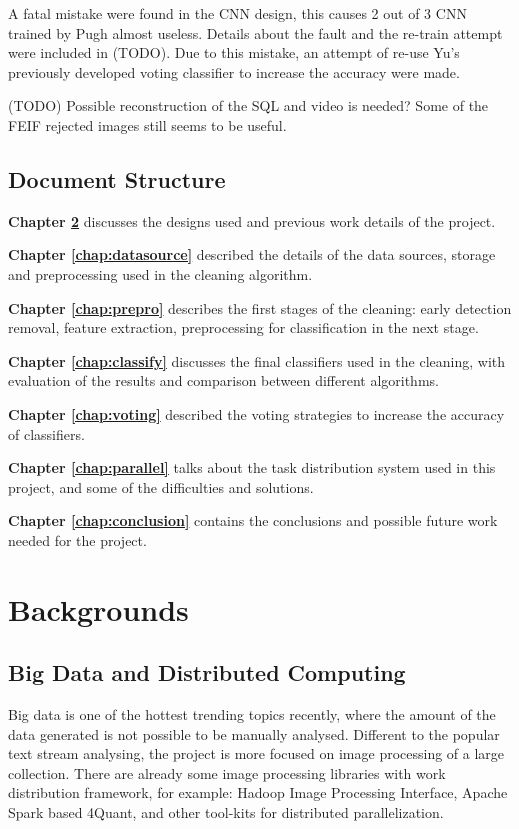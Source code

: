 \documentclass[bsc,logo,twoside,fullspacing,parskip]{infthesis}
\begin{document}
A fatal mistake were found in the CNN design, this causes 2 out of 3 CNN trained by Pugh almost useless. Details about the fault and the re-train attempt were included in (TODO).
Due to this mistake, an attempt of re-use Yu's previously developed voting classifier to increase the accuracy were made. 

(TODO) Possible reconstruction of the SQL and video is needed? Some of the FEIF rejected images still seems to be useful.

\section{Document Structure}

\textbf{Chapter \ref{chap:bg}} discusses the designs used and previous work details of the project. 

\textbf{Chapter \ref{chap:datasource}} described the details of the data sources, storage and preprocessing used in the cleaning algorithm.

\textbf{Chapter \ref{chap:prepro}} describes the first stages of the cleaning: early detection removal, feature extraction, preprocessing for classification in the next stage.

\textbf{Chapter \ref{chap:classify}} discusses the final classifiers used in the cleaning, with evaluation of the results and comparison between different algorithms. 

\textbf{Chapter \ref{chap:voting}} described the voting strategies to increase the accuracy of classifiers.

\textbf{Chapter \ref{chap:parallel}} talks about the task distribution system used in this project, and some of the difficulties and solutions.

\textbf{Chapter \ref{chap:conclusion}} contains the conclusions and possible future work needed for the project.
\newpage

\chapter{Backgrounds}
\label{chap:bg}

\section{Big Data and Distributed Computing}

Big data is one of the hottest trending topics recently, where the amount of the data generated is not possible to be manually analysed. 
Different to the popular text stream analysing, the project is more focused on image processing of a large collection. 
There are already some image processing libraries with work distribution framework, for example: Hadoop Image Processing Interface\cite{L3}, Apache Spark based 4Quant\cite{L4}, and other tool-kits for distributed parallelization.
\end{document}
